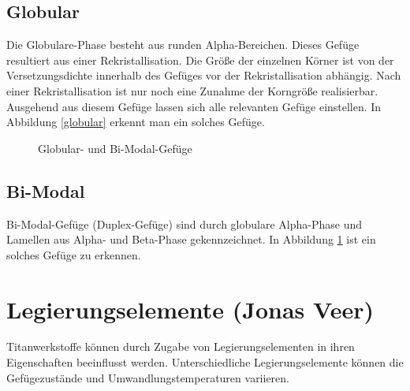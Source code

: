 \documentclass[a4paper, 11pt]{tubsreprt}
\begin{document}
\subsection{Globular}
Die Globulare-Phase besteht aus runden Alpha-Bereichen. Dieses Gefüge resultiert aus einer Rekristallisation. Die Größe der einzelnen Körner ist von der Versetzungsdichte innerhalb des Gefüges vor der Rekristallisation abhängig. Nach einer Rekristallisation ist nur noch eine Zunahme der Korngröße realisierbar. Ausgehend aus diesem Gefüge lassen sich alle relevanten Gefüge einstellen. In Abbildung \ref{globular} erkennt man ein solches Gefüge. 
\begin{figure} %
\caption{Globular- und Bi-Modal-Gefüge}
\label{globular}
\label{bimodal}
\end{figure}

\subsection{Bi-Modal}
Bi-Modal-Gefüge (Duplex-Gefüge) sind durch globulare Alpha-Phase und Lamellen aus Alpha- und Beta-Phase gekennzeichnet. In Abbildung \ref{bimodal} ist ein solches Gefüge zu erkennen. 

\newpage
\section{Legierungselemente (Jonas Veer)}
Titanwerkstoffe können durch Zugabe von Legierungselementen in ihren Eigenschaften beeinflusst werden. 
Unterschiedliche Legierungselemente können die Gefügezustände und Umwandlungstemperaturen variieren. 
\end{document}

